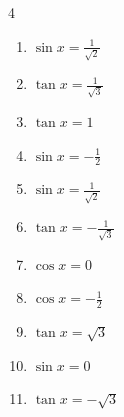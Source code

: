 \begin{multicols}{4}
\begin{enumerate}
  \item $\displaystyle \sin{x}  = \frac{1}{\sqrt{2}}$


  \item $\displaystyle \tan{x}  = \frac{1}{\sqrt{3}}$


  \item $\displaystyle \tan{x}  = 1$


  \item $\displaystyle \sin{x}  = -\frac{1}{2}$


  \item $\displaystyle \sin{x}  = \frac{1}{\sqrt{2}}$


  \item $\displaystyle \tan{x}  = -\frac{1}{\sqrt{3}}$


  \item $\displaystyle \cos{x}  = 0$


\columnbreak %

  \item $\displaystyle \cos{x}  = -\frac{1}{2}$


  \item $\displaystyle \tan{x}  = \sqrt{3}$


  \item $\displaystyle \sin{x}  = 0$


  \item $\displaystyle \tan{x}  = -\sqrt{3}$



\end{enumerate}
\end{multicols}
